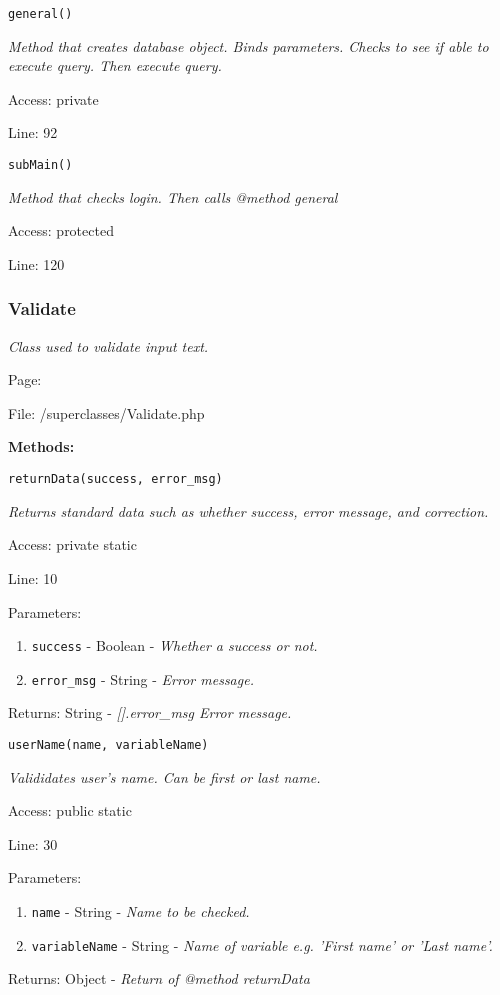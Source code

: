\texttt{general()}

{\scriptsize
\textit{Method that creates database object.
Binds parameters.
Checks to see if able to execute query.
Then execute query.}

Access: private

Line: 92

}

\texttt{subMain()}

{\scriptsize
\textit{Method that checks login.
Then calls @method general}

Access: protected

Line: 120

}

\subsubsection{Validate}\label{Validate.php.doc}
\textit{Class used to validate input text.}

Page: \pageref{Validate.php}

File: /superclasses/Validate.php

\textbf{Methods:}

\texttt{returnData(success, error\_msg)}

{\scriptsize
\textit{Returns standard data such as whether success, error message, and correction.}

Access: private static

Line: 10

Parameters:

\begin{enumerate}
\item \texttt{success} - Boolean - \textit{Whether a success or not.}
\item \texttt{error\_msg} - String - \textit{Error message.}
\end{enumerate}
Returns: String - \textit{[].error\_msg  Error message.}

}

\texttt{userName(name, variableName)}

{\scriptsize
\textit{Valididates user's name.
Can be first or last name.}

Access: public static

Line: 30

Parameters:

\begin{enumerate}
\item \texttt{name} - String - \textit{Name to be checked.}
\item \texttt{variableName} - String - \textit{Name of variable e.g. 'First name' or 'Last name'.}
\end{enumerate}
Returns: Object - \textit{Return of @method returnData}

}

